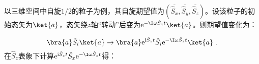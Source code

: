 
\begin{issues}
\issueMissDepend
\issueTODO
\end{issues}



以三维空间中自旋$1/2$的粒子为例，其自旋期望值为$(\overline{\hat S_x},\overline{\hat S_y},\overline{\hat S_z})$。设该粒子的初始态矢为$\ket{a}$，态矢绕$z$轴“转动”后变为$\mathrm e^{-\mathrm \I\omega \hat S_zt}\ket{a}$。则期望值变化为：

\begin{equation}
\bra{a}\hat S_i\ket{a}\rightarrow \bra{a}\mathrm e^{\mathrm i \hat S_zt}\hat S_i\mathrm e^{-\mathrm \I\omega \hat S_zt}\ket{a}~.
\end{equation}
在$\hat S_z$表象下计算$\mathrm e^{\mathrm i \hat S_zt}\hat S_x\mathrm e^{-\mathrm \I\omega \hat S_zt}$得：

